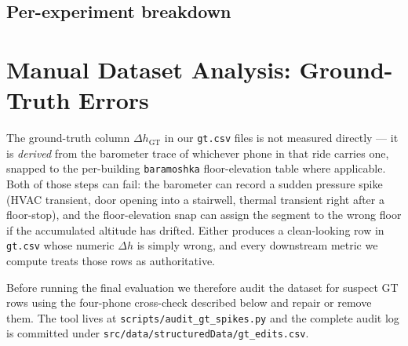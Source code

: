 \subsection{Per-experiment breakdown}

\begin{table}[H]
\centering
\small

\caption{Per-experiment metrics on the train split. ``Cov.'' is the
$90\%$-CI coverage; $\tilde{w}$ is the median CI half-width.}
\label{tab:per-exp-train}
\end{table}

\begin{table}[H]
\centering
\small

\caption{Per-experiment metrics on the blind-test split.}
\label{tab:per-exp-test}
\end{table}

\section{Manual Dataset Analysis: Ground-Truth Errors}
\label{sec:dataset-gt-analysis}

The ground-truth column $\Delta h_\mathrm{GT}$ in our \texttt{gt.csv}
files is not measured directly — it is \emph{derived} from the
barometer trace of whichever phone in that ride carries one, snapped
to the per-building \texttt{baramoshka} floor-elevation table where
applicable. Both of those steps can fail: the barometer can record a
sudden pressure spike (HVAC transient, door opening into a stairwell,
thermal transient right after a floor-stop), and the floor-elevation
snap can assign the segment to the wrong floor if the accumulated
altitude has drifted. Either produces a clean-looking row in
\texttt{gt.csv} whose numeric $\Delta h$ is simply wrong, and every
downstream metric we compute treats those rows as authoritative.

Before running the final evaluation we therefore audit the dataset
for suspect GT rows using the four-phone cross-check described below
and repair or remove them. The tool lives at
\texttt{scripts/audit\_gt\_spikes.py} and the complete audit log is
committed under
\texttt{src/data/structuredData/gt\_edits.csv}.

